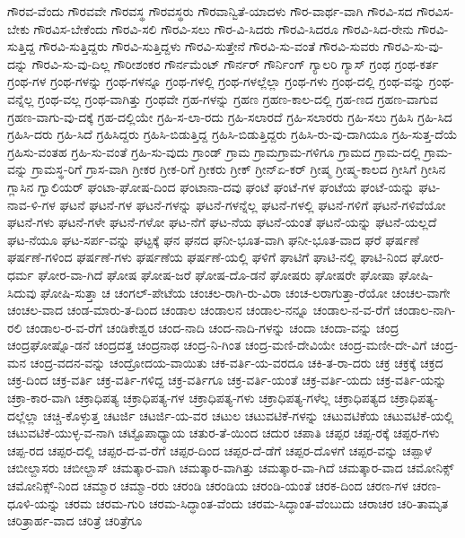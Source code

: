 {ಗೌರವ-ವೆಂದು
ಗೌರವವೇ
ಗೌರವಸ್ಥ
ಗೌರವಸ್ಥರು
ಗೌರವಾನ್ವಿತೆ-ಯಾದಳು
ಗೌರ-ವಾರ್ಥ-ವಾಗಿ
ಗೌರವಿ-ಸದ
ಗೌರವಿಸ-ಬೇಕು
ಗೌರವಿಸ-ಬೇಕೆಂದು
ಗೌರವಿ-ಸಲಿ
ಗೌರವಿ-ಸಲು
ಗೌರ-ವಿ-ಸಿದರು
ಗೌರವಿ-ಸಿದರೂ
ಗೌರವಿ-ಸಿದ-ರೇನು
ಗೌರವಿ-ಸುತ್ತಿದ್ದ
ಗೌರವಿ-ಸುತ್ತಿದ್ದರು
ಗೌರವಿ-ಸುತ್ತಿದ್ದಳು
ಗೌರವಿ-ಸುತ್ತೇನೆ
ಗೌರವಿ-ಸು-ವಂತೆ
ಗೌರವಿ-ಸುವರು
ಗೌರವಿ-ಸು-ವು-ದನ್ನು
ಗೌರವಿ-ಸು-ವು-ದಿಲ್ಲ
ಗೌರೀಶಂಕರ
ಗೌರ್ನಮೆಂಟ್
ಗೌರ್ನರ್
ಗೌರ್ನಿಂಗ್
ಗ್ಯಾಲರಿ
ಗ್ಯಾಸ್
ಗ್ರಂಥ
ಗ್ರಂಥ-ಕರ್ತ
ಗ್ರಂಥ-ಗಳ
ಗ್ರಂಥ-ಗಳನ್ನು
ಗ್ರಂಥ-ಗಳನ್ನೂ
ಗ್ರಂಥ-ಗಳಲ್ಲಿ
ಗ್ರಂಥ-ಗಳಲ್ಲೆಲ್ಲಾ
ಗ್ರಂಥ-ಗಳು
ಗ್ರಂಥ-ದಲ್ಲಿ
ಗ್ರಂಥ-ವನ್ನು
ಗ್ರಂಥ-ವನ್ನೆಲ್ಲ
ಗ್ರಂಥ-ವಲ್ಲ
ಗ್ರಂಥ-ವಾಗಿತ್ತು
ಗ್ರಂಥವೇ
ಗ್ರಹ-ಗಳನ್ನು
ಗ್ರಹಣ
ಗ್ರಹಣ-ಕಾಲ-ದಲ್ಲಿ
ಗ್ರಹ-ಣದ
ಗ್ರಹಣ-ವಾಗುವ
ಗ್ರಹಣ-ವಾಗು-ವು-ದಕ್ಕೆ
ಗ್ರಹ-ದಲ್ಲಿಯೇ
ಗ್ರಹಿ-ಸ-ಲಾ-ರದು
ಗ್ರಹಿ-ಸಲಾರದೆ
ಗ್ರಹಿ-ಸಲಾರರು
ಗ್ರಹಿ-ಸಲು
ಗ್ರಹಿಸಿ
ಗ್ರಹಿ-ಸಿದ
ಗ್ರಹಿಸಿ-ದರು
ಗ್ರಹಿ-ಸಿದೆ
ಗ್ರಹಿಸಿದ್ದರು
ಗ್ರಹಿಸಿ-ಬಿಡುತ್ತಿದ್ದ
ಗ್ರಹಿಸಿ-ಬಿಡುತ್ತಿದ್ದರು
ಗ್ರಹಿಸಿ-ರು-ವು-ದಾಗಿಯೂ
ಗ್ರಹಿ-ಸುತ್ತ-ದೆಯೆ
ಗ್ರಹಿಸು-ವಂತಹ
ಗ್ರಹಿ-ಸು-ವಂತೆ
ಗ್ರಹಿ-ಸು-ವುದು
ಗ್ರಾಂಡ್
ಗ್ರಾಮ
ಗ್ರಾಮಗ್ರಾಮ-ಗಳಿಗೂ
ಗ್ರಾಮದ
ಗ್ರಾಮ-ದಲ್ಲಿ
ಗ್ರಾಮ-ವನ್ನು
ಗ್ರಾಮಸ್ಥ-ರಿಗೆ
ಗ್ರಾಸ-ವಾಗಿ
ಗ್ರೀಕರ
ಗ್ರೀಕ-ರಿಗೆ
ಗ್ರೀಕರು
ಗ್ರೀಕ್
ಗ್ರೀನ್ಏ-ಕರ್
ಗ್ರೀಷ್ಮ
ಗ್ರೀಷ್ಮ-ಕಾಲದ
ಗ್ರೀಸಿಗೆ
ಗ್ರೀಸಿನ
ಗ್ಲಾಸಿನ
ಗ್ವಾಲಿಯರ್
ಘಂಟಾ-ಘೋಷ-ದಿಂದ
ಘಂಟಾನಾ-ದವು
ಘಂಟೆ
ಘಂಟೆ-ಗಳ
ಘಂಟೆಯ
ಘಂಟೆ-ಯನ್ನು
ಘಟ-ನಾವ-ಳಿ-ಗಳ
ಘಟನೆ
ಘಟನೆ-ಗಳ
ಘಟನೆ-ಗಳನ್ನು
ಘಟನೆ-ಗಳನ್ನೆಲ್ಲ
ಘಟನೆ-ಗಳಲ್ಲಿ
ಘಟನೆ-ಗಳಿಗೆ
ಘಟನೆ-ಗಳಿವೆಯೋ
ಘಟನೆ-ಗಳು
ಘಟನೆ-ಗಳೇ
ಘಟನೆ-ಗಳೋ
ಘಟ-ನೆಗೆ
ಘಟ-ನೆಯ
ಘಟನೆ-ಯಂತೆ
ಘಟನೆ-ಯನ್ನು
ಘಟನೆ-ಯಲ್ಲದೆ
ಘಟ-ನೆಯೂ
ಘಟ-ಸರ್ಪ-ವನ್ನು
ಘಟ್ಟಕ್ಕೆ
ಘನ
ಘನದ
ಘನೀ-ಭೂತ-ವಾಗಿ
ಘನೀ-ಭೂತ-ವಾದ
ಘರೆ
ಘರ್ಷಣೆ
ಘರ್ಷಣೆ-ಗಳಿಂದ
ಘರ್ಷಣೆ-ಗಳು
ಘರ್ಷಣೆಯ
ಘರ್ಷಣೆ-ಯಲ್ಲಿ
ಘಳಿಗೆ
ಘಾಟಿಗೆ
ಘಾಟಿ-ನಲ್ಲಿ
ಘಾಟಿ-ನಿಂದ
ಘೋರ-ಧರ್ಮ
ಘೋರ-ವಾ-ಗಿದೆ
ಘೋಷ
ಘೋಷ-ಜರೆ
ಘೋಷ-ದೊ-ಡನೆ
ಘೋಷರು
ಘೋಷರೇ
ಘೋಷಾ
ಘೋಷಿ-ಸಿದುವು
ಘೋಷಿ-ಸುತ್ತಾ
ಚ
ಚಂಗಲ್-ಪೇಟೆಯ
ಚಂಚಲ-ರಾಗಿ-ರು-ವಿರಾ
ಚಂಚ-ಲರಾಗುತ್ತಾ-ರೆಯೋ
ಚಂಚಲ-ವಾಗೇ
ಚಂಚಲ-ವಾದ
ಚಂಡ-ಮಾರು-ತ-ದಿಂದ
ಚಂಡಾಲ
ಚಂಡಾಲನ
ಚಂಡಾಲ-ನನ್ನೂ
ಚಂಡಾಲ-ನ-ವ-ರೆಗೆ
ಚಂಡಾಲ-ನಾಗಿ-ರಲಿ
ಚಂಡಾಲ-ರ-ವ-ರೆಗೆ
ಚಂಡಿಕೇಶ್ವರ
ಚಂದ-ನಾದಿ
ಚಂದ-ನಾದಿ-ಗಳನ್ನು
ಚಂದಾ
ಚಂದಾ-ವನ್ನು
ಚಂದ್ರ
ಚಂದ್ರಘೋಷ್ನೊ-ಡನೆ
ಚಂದ್ರದತ್ತ
ಚಂದ್ರನಾಥ
ಚಂದ್ರ-ನಿ-ಗಿಂತ
ಚಂದ್ರ-ಮಣಿ-ದೇವಿಯೇ
ಚಂದ್ರ-ಮಣೀ-ದೇ-ವಿಗೆ
ಚಂದ್ರ-ಮನ
ಚಂದ್ರ-ವದನ-ವನ್ನು
ಚಂದ್ರೋದಯ-ವಾಯಿತು
ಚಕ-ವರ್ತಿ-ಯ-ವರದೂ
ಚಕಿ-ತ-ರಾ-ದರು
ಚಕ್ರ
ಚಕ್ರಕ್ಕೆ
ಚಕ್ರದ
ಚಕ್ರ-ದಿಂದ
ಚಕ್ರ-ವರ್ತಿ
ಚಕ್ರ-ವರ್ತಿ-ಗಳಿದ್ದ
ಚಕ್ರ-ವರ್ತಿಗೂ
ಚಕ್ರ-ವರ್ತಿ-ಯಂತೆ
ಚಕ್ರ-ವರ್ತಿ-ಯದು
ಚಕ್ರ-ವರ್ತಿ-ಯನ್ನು
ಚಕ್ರಾ-ಕಾರ-ವಾಗಿ
ಚಕ್ರಾಧಿಪತ್ಯ
ಚಕ್ರಾಧಿಪತ್ಯ-ಗಳ
ಚಕ್ರಾಧಿಪತ್ಯ-ಗಳು
ಚಕ್ರಾಧಿಪತ್ಯ-ಗಳೆಲ್ಲ
ಚಕ್ರಾಧಿಪತ್ಯದ
ಚಕ್ರಾಧಿಪತ್ಯ-ದಲ್ಲೆಲ್ಲಾ
ಚಚ್ಚಿ-ಕೊಳ್ಳುತ್ತ
ಚಟರ್ಜಿ
ಚಟರ್ಜಿ-ಯ-ವರ
ಚಟುಲ
ಚಟುವಟಿಕೆ-ಗಳನ್ನು
ಚಟುವಟಿಕೆಯ
ಚಟುವಟಿಕೆ-ಯಲ್ಲಿ
ಚಟುವಟಿಕೆ-ಯುಳ್ಳ-ವ-ನಾಗಿ
ಚಟ್ಟೊಪಾಧ್ಯಾಯ
ಚತುರ-ತೆ-ಯಿಂದ
ಚದುರ
ಚಪಾತಿ
ಚಪ್ಪರ
ಚಪ್ಪ-ರಕ್ಕೆ
ಚಪ್ಪರ-ಗಳು
ಚಪ್ಪ-ರದ
ಚಪ್ಪರ-ದಲ್ಲಿ
ಚಪ್ಪರ-ದ-ವ-ರೆಗೆ
ಚಪ್ಪರ-ದಿಂದ
ಚಪ್ಪರ-ದೆ-ಡೆಗೆ
ಚಪ್ಪರ-ದೊಳಗೆ
ಚಪ್ಪರ-ವನ್ನು
ಚಪ್ಪಾಳೆ
ಚಬೀಲ್ದಾಸರು
ಚಬೀಲ್ದಾಸ್
ಚಮತ್ಕಾರ-ವಾಗಿ
ಚಮತ್ಕಾರ-ವಾಗಿತ್ತು
ಚಮತ್ಕಾರ-ವಾ-ಗಿದೆ
ಚಮತ್ಕಾರ-ವಾದ
ಚಮೋನಿಕ್ಸ್
ಚಮೋನಿಕ್ಸ್-ನಿಂದ
ಚಮ್ಮಾರ
ಚಮ್ಮಾ-ರರು
ಚರಂಡಿ
ಚರಂಡಿಯ
ಚರಂಡಿ-ಯಂತೆ
ಚರಕ-ದಿಂದ
ಚರಣ-ಗಳ
ಚರಣ-ಧೂಳಿ-ಯನ್ನು
ಚರಮ
ಚರಮ-ಗುರಿ
ಚರಮ-ಸಿದ್ಧಾಂತ-ವೆಂದು
ಚರಮ-ಸಿದ್ಧಾಂತ-ವೆಂಬುದು
ಚರಾಚರ
ಚರಿ-ತಾಮೃತ
ಚರಿತ್ರಾರ್ಹ-ವಾದ
ಚರಿತ್ರೆ
ಚರಿತ್ರೆಗೂ
}
